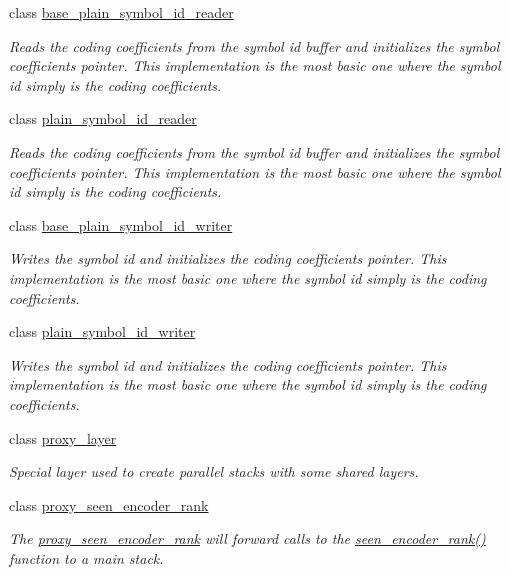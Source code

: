 \begin{DoxyCompactItemize}
class \hyperlink{classkodo_1_1base__plain__symbol__id__reader}{base\-\_\-plain\-\_\-symbol\-\_\-id\-\_\-reader}
\begin{DoxyCompactList}\small\item\em Reads the coding coefficients from the symbol id buffer and initializes the symbol coefficients pointer. This implementation is the most basic one where the symbol id simply is the coding coefficients. \end{DoxyCompactList}\item 
class \hyperlink{classkodo_1_1plain__symbol__id__reader}{plain\-\_\-symbol\-\_\-id\-\_\-reader}
\begin{DoxyCompactList}\small\item\em Reads the coding coefficients from the symbol id buffer and initializes the symbol coefficients pointer. This implementation is the most basic one where the symbol id simply is the coding coefficients. \end{DoxyCompactList}\item 
class \hyperlink{classkodo_1_1base__plain__symbol__id__writer}{base\-\_\-plain\-\_\-symbol\-\_\-id\-\_\-writer}
\begin{DoxyCompactList}\small\item\em Writes the symbol id and initializes the coding coefficients pointer. This implementation is the most basic one where the symbol id simply is the coding coefficients. \end{DoxyCompactList}\item 
class \hyperlink{classkodo_1_1plain__symbol__id__writer}{plain\-\_\-symbol\-\_\-id\-\_\-writer}
\begin{DoxyCompactList}\small\item\em Writes the symbol id and initializes the coding coefficients pointer. This implementation is the most basic one where the symbol id simply is the coding coefficients. \end{DoxyCompactList}\item 
class \hyperlink{classkodo_1_1proxy__layer}{proxy\-\_\-layer}
\begin{DoxyCompactList}\small\item\em Special layer used to create parallel stacks with some shared layers. \end{DoxyCompactList}\item 
class \hyperlink{classkodo_1_1proxy__seen__encoder__rank}{proxy\-\_\-seen\-\_\-encoder\-\_\-rank}
\begin{DoxyCompactList}\small\item\em The \hyperlink{classkodo_1_1proxy__seen__encoder__rank}{proxy\-\_\-seen\-\_\-encoder\-\_\-rank} will forward calls to the \hyperlink{classkodo_1_1proxy__seen__encoder__rank_a7c7561fc6d6825fdba4137d044e959c2}{seen\-\_\-encoder\-\_\-rank()} function to a main stack. \end{DoxyCompactList}\item 

\end{DoxyCompactItemize}
